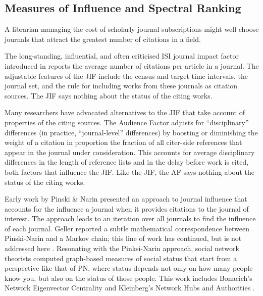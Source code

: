 \documentclass[10pt]{article}
\begin{document}
\subsection{Measures of Influence and Spectral Ranking}

A librarian managing the cost of scholarly journal subscriptions might well choose journals that attract the greatest number of citations in a field.  


The long-standing, influential, and often criticised ISI journal impact factor introduced in \cite{garfield1955} reports the average number of citations per article in a journal. The adjustable
features of the JIF include the census and target time intervals, the journal set, and the
rule for including works from these journals as citation sources. The JIF says nothing
about the status of the citing works.

Many researchers have advocated alternatives to the JIF that take account of properties of the citing sources. The Audience Factor \citep{zitt2008} adjusts for
“disciplinary” differences (in practice, “journal-level” differences) by boosting or diminishing the weight of a citation in proportion the fraction of all citer-side references
that appear in the journal under consideration. This accounts for average disciplinary
differences in the length of reference lists and in the delay before work is cited, both
factors that influence the JIF. Like the JIF, the AF says nothing about the status of
the citing works.

Early work by Pinski \& Narin \citep{pinski} presented an approach to journal influence
that accounts for the influence a journal when it provides citations
to the journal of interest. The approach leads to an iteration over all journals to find
the influence of each journal. Geller reported a subtle mathematical correspondence between
Pinski-Narin and a Markov chain; this line of work has continued, but is not addressed
here \citep{vigna}. Resonating with the Pinksi-Narin approach, social network theorists computed
graph-based measures of social status that start from a perspective like that of PN,
where status depends not only on how many people know you, but also on the status of
those people. This work includes Bonacich's Network Eigenvector Centrality \citep{bonacich} and Kleinberg's
Network Hubs and Authorities \citep{kleinberg}.
\end{document}
